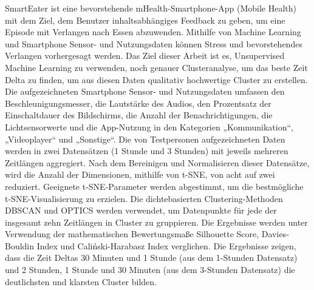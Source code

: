 SmartEater ist eine bevorstehende mHealth-Smartphone-App (Mobile Health) mit dem Ziel, dem Benutzer inhaltsabhängiges Feedback zu geben, um eine Episode mit Verlangen nach Essen abzuwenden. Mithilfe von Machine Learning und Smartphone Sensor- und Nutzungsdaten können Stress und bevorstehendes Verlangen vorhergesagt werden. Das Ziel dieser Arbeit ist es, Unsupervised Machine Learning zu verwenden, noch genauer Clusteranalyse, um das beste Zeit Delta zu finden, um aus diesen Daten qualitativ hochwertige Cluster zu erstellen. Die aufgezeichneten Smartphone Sensor- und Nutzungsdaten umfassen den Beschleunigungsmesser, die Lautstärke des Audios, den Prozentsatz der Einschaltdauer des Bildschirms, die Anzahl der Benachrichtigungen, die Lichtsensorwerte und die App-Nutzung in den Kategorien „Kommunikation“, „Videoplayer“ und „Sonstige“. Die von Testpersonen aufgezeichneten Daten werden in zwei Datensätzen (1 Stunde und 3 Stunden) mit jeweils mehreren Zeitlängen aggregiert. Nach dem Bereinigen und Normalisieren dieser Datensätze, wird die Anzahl der Dimensionen, mithilfe von t-SNE, von acht auf zwei reduziert. Geeignete t-SNE-Parameter werden abgestimmt, um die bestmögliche t-SNE-Visualisierung zu erzielen. Die dichtebasierten Clustering-Methoden DBSCAN und OPTICS werden verwendet, um Datenpunkte für jede der insgesamt zehn Zeitlängen in Cluster zu gruppieren. Die Ergebnisse werden unter Verwendung der mathematischen Bewertungsmaße Silhouette Score, Davies-Bouldin Index und Caliński-Harabasz Index verglichen. Die Ergebnisse zeigen, dass die Zeit Deltas 30 Minuten und 1 Stunde (aus dem 1-Stunden Datensatz) und 2 Stunden, 1 Stunde und 30 Minuten (aus dem 3-Stunden Datensatz) die deutlichsten und klarsten Cluster bilden.